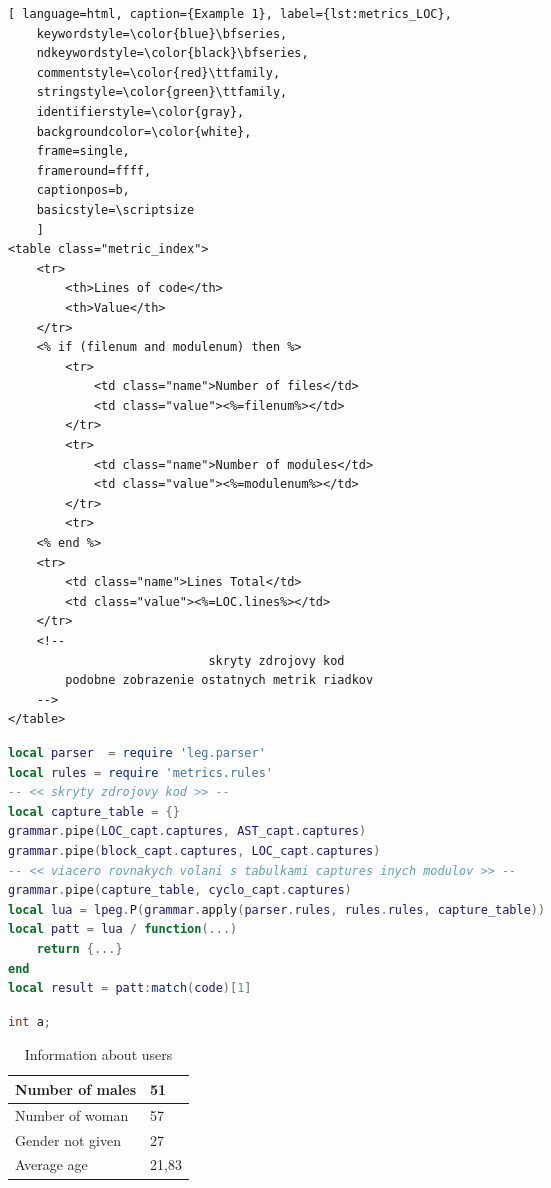 \begin{lstlisting}[ language=html, caption={Example 1}, label={lst:metrics_LOC},
	keywordstyle=\color{blue}\bfseries,
	ndkeywordstyle=\color{black}\bfseries,
	commentstyle=\color{red}\ttfamily,
	stringstyle=\color{green}\ttfamily,
	identifierstyle=\color{gray},
	backgroundcolor=\color{white}, 
	frame=single, 
	frameround=ffff,
	captionpos=b,
	basicstyle=\scriptsize
	]
<table class="metric_index">
	<tr>
		<th>Lines of code</th>
		<th>Value</th>
	</tr>
	<% if (filenum and modulenum) then %>
		<tr>
			<td class="name">Number of files</td>
			<td class="value"><%=filenum%></td>
		</tr>
		<tr>
			<td class="name">Number of modules</td>
			<td class="value"><%=modulenum%></td>
		</tr>
		<tr>
	<% end %>
	<tr>
		<td class="name">Lines Total</td>
		<td class="value"><%=LOC.lines%></td>
	</tr>
	<!--
							skryty zdrojovy kod
		podobne zobrazenie ostatnych metrik riadkov
	-->
</table>
\end{lstlisting}

\begin{lstlisting}[language=lua, caption={Názov}, label=metrics.pipe]
local parser  = require 'leg.parser'
local rules = require 'metrics.rules'
-- << skryty zdrojovy kod >> --
local capture_table = {}
grammar.pipe(LOC_capt.captures, AST_capt.captures)
grammar.pipe(block_capt.captures, LOC_capt.captures)
-- << viacero rovnakych volani s tabulkami captures inych modulov >> --
grammar.pipe(capture_table, cyclo_capt.captures)
local lua = lpeg.P(grammar.apply(parser.rules, rules.rules, capture_table))
local patt = lua / function(...) 
	return {...} 
end
local result = patt:match(code)[1]
\end{lstlisting}

\begin{lstlisting}[language=C++, tabsize=2, caption={Manager}]
int a;
\end{lstlisting}



\begin{table}[ht]
    \centering
    \begin{tabular}{ | l | l | }
    \hline
    Number of males & 51 \\ \hline
    Number of woman & 57 \\ \hline
    Gender not given & 27 \\ \hline
    Average age & 21,83 \\ \hline
    \end{tabular}
    \caption{Information about users}
    \label{tab:table1}
\end{table}
